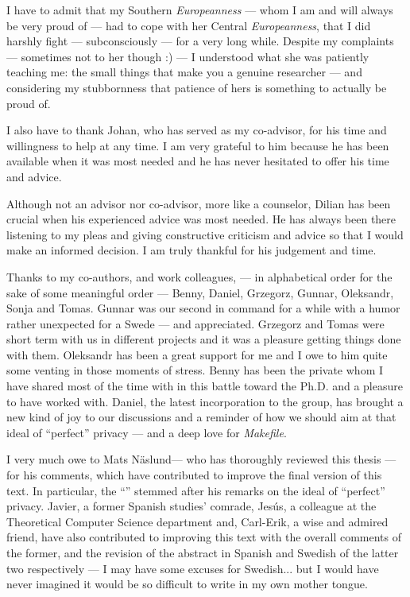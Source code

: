 I have to admit that my Southern \emph{Europeanness} --- whom I am and will always 
be very proud of --- had to cope with her Central \emph{Europeanness}, that I did 
harshly fight --- subconsciously --- for a very long while. Despite my complaints 
--- sometimes not to her though :) --- I understood what she was patiently teaching 
me: the small things that make you a genuine researcher --- and considering my stubbornness 
that patience of hers is something to actually be proud of.

I also have to thank Johan, who has served as my co-advisor, for his time and willingness 
to help at any time. I am very grateful to him because he has been available when 
it was most needed and he has never hesitated to offer his time and advice. 

Although not an advisor nor co-advisor, more like a counselor, Dilian has been crucial 
when his experienced advice was most needed. He has always been there listening 
to my pleas and giving constructive criticism and advice so that I would make an 
informed decision. I am truly thankful for his judgement and time.

Thanks to my co-authors, and work colleagues, --- in alphabetical order for the 
sake of some meaningful order --- Benny, Daniel, Grzegorz, Gunnar, Oleksandr, Sonja 
and Tomas. Gunnar was our second in command for a while with a humor rather unexpected 
for a Swede --- and appreciated. Grzegorz and Tomas were short term with us in different 
projects and it was a pleasure getting things done with them. Oleksandr has been 
a great support for me and I owe to him quite some venting in those moments of stress. 
Benny has been the private whom I have shared most of the time with in this battle toward 
the Ph.D. and a pleasure to have worked with. Daniel, the latest incorporation 
to the group, has brought a new kind of joy to our discussions and a reminder of 
how we should aim at that ideal of ``perfect'' privacy --- and a deep love for 
\emph{Makefile}.

I very much owe to Mats N\"{a}slund--- who has thoroughly reviewed this thesis --- 
for his comments, which have contributed to improve the final version of this text. 
In particular, the  ``'' 
stemmed after his remarks on the ideal of ``perfect'' privacy. Javier, a former 
Spanish studies' comrade, Jes\'{u}s, a colleague at the Theoretical Computer Science 
department and, Carl-Erik, a wise and admired friend, have also contributed 
to improving this text with the overall comments of the former, and the revision 
of the abstract in Spanish and Swedish of the latter two respectively --- I may 
have some excuses for Swedish... but I would have never imagined it would be so 
difficult to write in my own mother tongue. 

